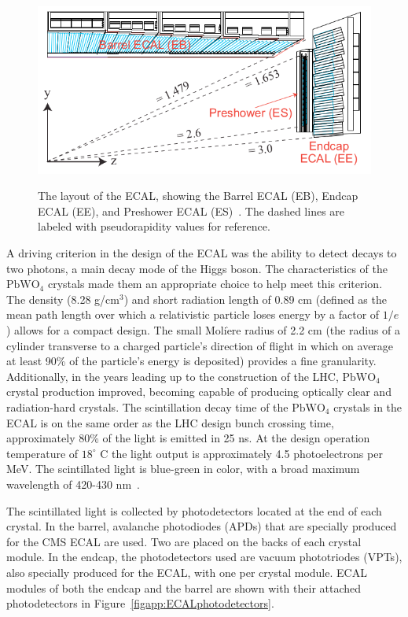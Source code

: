 \begin{figure}[!Hh]
       \centering
       \includegraphics[scale=0.6]{Figures/ECALlayout.png} \\
       \caption[The layout of the CMS electromagnetic calorimeter.]{The layout of the ECAL, showing the Barrel ECAL (EB), Endcap ECAL (EE), and Preshower ECAL (ES)~\cite{CMStdr}.  The dashed lines are labeled with pseudorapidity values for reference.}
\label{figapp:ECALlayout}
\end{figure}


A driving criterion in the design of the ECAL was the ability to detect decays to two photons, a main decay mode of the Higgs boson.  The characteristics of the $\text{PbWO}_4$ crystals made them an appropriate choice to help meet this criterion.  The density (8.28 g/$\text{cm}^3$) and short radiation length of 0.89 cm (defined as the mean path length over which a relativistic particle loses energy by a factor of $1/e$) allows for a compact design.  The small Moli$\grave{\text{e}}$re radius of 2.2 cm (the radius of a cylinder transverse to a charged particle's direction of flight in which on average at least 90\% of the particle's energy is deposited) provides a fine granularity.  Additionally, in the years leading up to the construction of the LHC, $\text{PbWO}_4$ crystal production improved, becoming capable of producing optically clear and radiation-hard crystals.  The scintillation decay time of the $\text{PbWO}_4$ crystals in the ECAL is on the same order as the LHC design bunch crossing time, approximately 80\% of the light is emitted in 25 ns.  At the design operation temperature of $18^{\circ}$ C the light output is approximately 4.5 photoelectrons per MeV.  The scintillated light is blue-green in color, with a broad maximum wavelength of 420-430 nm~\cite{CMSdetector}.

The scintillated light is collected by photodetectors located at the end of each crystal.  In the barrel, avalanche photodiodes (APDs) that are specially produced for the CMS ECAL are used.  Two are placed on the backs of each crystal module.  In the endcap, the photodetectors used are vacuum phototriodes (VPTs), also specially produced for the ECAL, with one per crystal module.  ECAL modules of both the endcap and the barrel are shown with their attached photodetectors in Figure~\ref{figapp:ECALphotodetectors}.

